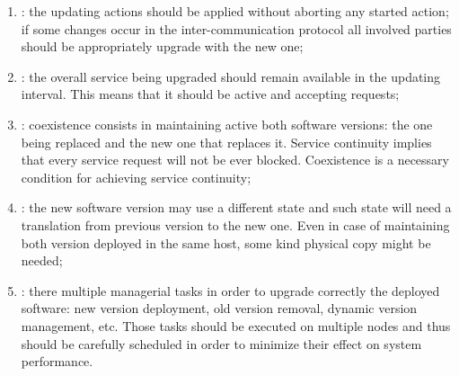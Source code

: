 \begin{enumerate}
	\item{: the updating actions should be applied without aborting any started
		action; if some changes occur in the inter-communication protocol all involved parties should be
		appropriately upgrade with the new one;}
	\item{: the overall service being upgraded should remain available
		in the updating interval. This means that it should be active and accepting requests;}
	\item{: coexistence consists in maintaining active both
		software versions: the one being replaced and the new one that replaces it. Service continuity
		implies that every service request will not be ever blocked. Coexistence is a necessary condition
		for achieving service continuity;}
	\item{: the new software version may use a different state and such state will
		need a translation from previous version to the new one. Even in case of maintaining both version
		deployed in the same host, some kind physical copy might be needed;}
	\item{: there multiple managerial tasks in order to upgrade correctly the
		deployed software: new version deployment, old version removal, dynamic version management, etc.
		Those tasks should be executed on multiple nodes and thus should be carefully scheduled in order
		to minimize their effect on system performance.}
\end{enumerate}